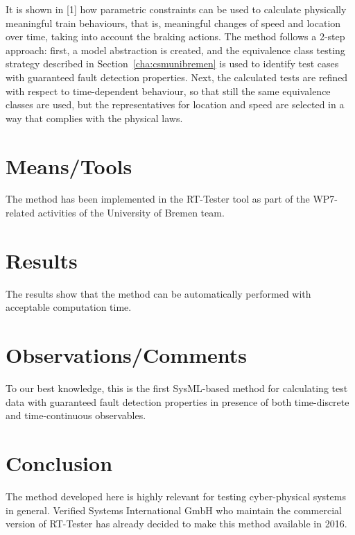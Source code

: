 It is shown in [1] how parametric constraints can be used to calculate
physically meaningful train behaviours, that is, meaningful changes of
speed and location over time, taking into account the braking
actions. The method follows a 2-step approach: first, a model
abstraction is created, and the equivalence class testing strategy
described in Section~\ref{cha:csmunibremen} is used to identify test
cases with guaranteed fault detection properties. Next, the calculated
tests are refined with respect to time-dependent behaviour, so that
still the same equivalence classes are used, but the representatives
for location and speed are selected in a way that complies with the
physical laws.

 


\section{Means/Tools}

The method has been implemented in the RT-Tester tool as part of the WP7-related
activities of the University of Bremen team.

\section{Results}

The results show that the method can be automatically performed with acceptable 
computation time. 

\section{Observations/Comments}

To our best knowledge, this is the first SysML-based method for
calculating test data with guaranteed fault detection properties in
presence of both time-discrete and time-continuous observables.


\section{Conclusion}

The method developed here is highly relevant for testing
cyber-physical systems in general. Verified Systems International GmbH
who maintain the commercial version of RT-Tester has already decided
to make this method available in 2016.


